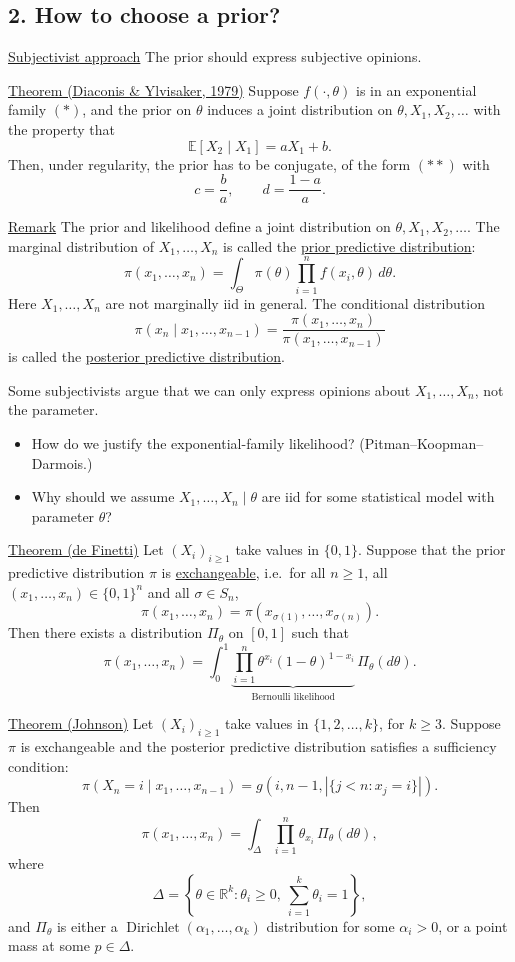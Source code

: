 \documentclass[11pt,a4paper]{article}
\begin{document}
\subsection*{2. How to choose a prior?}

\noindent\underline{Subjectivist approach}\quad
The prior should express subjective opinions.

\medskip
\noindent\underline{Theorem (Diaconis \& Ylvisaker, 1979)}\quad
Suppose $f(\cdot,\theta)$ is in an exponential family $(*)$, and the
prior on $\theta$ induces a joint distribution on $\theta,X_1,X_2,\ldots$
with the property that
\[
\mathbb E[X_2\mid X_1]=aX_1+b.
\]
Then, under regularity, the prior has to be conjugate, of the form $(**)$ with
\[
c=\frac ba,\qquad d=\frac{1-a}{a}.
\]

\medskip
\noindent\underline{Remark}\quad
The prior and likelihood define a joint distribution on
$\theta,X_1,X_2,\ldots$. The marginal distribution of $X_1,\ldots,X_n$
is called the \underline{prior predictive distribution}:
\[
\pi(x_1,\ldots,x_n)
=\int_\Theta\pi(\theta)\prod_{i=1}^n f(x_i,\theta)\,d\theta.
\]
Here $X_1,\ldots,X_n$ are not marginally iid in general.
The conditional distribution
\[
\pi(x_n\mid x_1,\ldots,x_{n-1})
=\frac{\pi(x_1,\ldots,x_n)}{\pi(x_1,\ldots,x_{n-1})}
\]
is called the \underline{posterior predictive distribution}.

Some subjectivists argue that we can only express opinions about
$X_1,\ldots,X_n$, not the parameter.
\begin{itemize}
\item How do we justify the exponential-family likelihood?
(Pitman--Koopman--Darmois.)
\item Why should we assume $X_1,\ldots,X_n\mid\theta$ are iid
for some statistical model with parameter $\theta$?
\end{itemize}

\medskip
\noindent\underline{Theorem (de Finetti)}\quad
Let $(X_i)_{i\geq1}$ take values in $\{0,1\}$.
Suppose that the prior predictive distribution $\pi$ is
\underline{exchangeable}, i.e.\ for all $n\geq1$, all
$(x_1,\ldots,x_n)\in\{0,1\}^n$ and all $\sigma\in S_n$,
\[
\pi(x_1,\ldots,x_n)=\pi(x_{\sigma(1)},\ldots,x_{\sigma(n)}).
\]
Then there exists a distribution $\Pi_\theta$ on $[0,1]$ such that
\[
\pi(x_1,\ldots,x_n)
=\int_0^1
\underbrace{\prod_{i=1}^n\theta^{x_i}(1-\theta)^{1-x_i}}
_{\text{Bernoulli likelihood}}
\,\Pi_\theta(d\theta).
\]

\medskip
\noindent\underline{Theorem (Johnson)}\quad
Let $(X_i)_{i\geq1}$ take values in $\{1,2,\ldots,k\}$, for $k\geq3$.
Suppose $\pi$ is exchangeable and the posterior predictive distribution
satisfies a sufficiency condition:
\[
\pi(X_n=i\mid x_1,\ldots,x_{n-1})
=g\left(i,n-1,\left|\{j<n:x_j=i\}\right|\right).
\]
Then
\[
\pi(x_1,\ldots,x_n)
=\int_\Delta\prod_{i=1}^n\theta_{x_i}\,\Pi_\theta(d\theta),
\]
where
\[
\Delta=\left\{\theta\in\mathbb R^k:
\theta_i\geq0,\ \sum_{i=1}^k\theta_i=1\right\},
\]
and $\Pi_\theta$ is either a $\operatorname{Dirichlet}(\alpha_1,\ldots,\alpha_k)$
distribution for some $\alpha_i>0$, or a point mass at some $p\in\Delta$.
\end{document}
